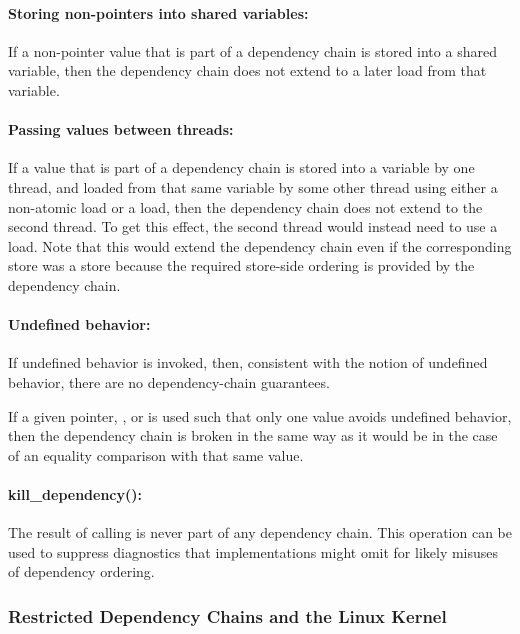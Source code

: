 \documentclass[letterpaper,twocolumn,10pt]{article}
\begin{document}
\paragraph{Storing non-pointers into shared variables:}
If a non-pointer value that is part of a dependency chain
is stored into a shared variable, then the dependency chain
does not extend to a later load from that variable.

\paragraph{Passing values between threads:}
If a value that is part of a dependency chain is stored into
a variable by one thread, and loaded from that same variable
by some other thread using either a non-atomic load or a
 load, then the dependency chain does
not extend to the second thread.
To get this effect, the second thread would instead need to use a
 load.
Note that this would extend the dependency chain even if the
corresponding store was a  store
because the required store-side ordering is provided by
the dependency chain.

\paragraph{Undefined behavior:}
If undefined behavior is invoked, then, consistent with the
notion of undefined behavior, there are no dependency-chain
guarantees.

If a given pointer, , or  is used
such that only one value avoids undefined behavior, then the
dependency chain is broken in the same way as it would be
in the case of an equality comparison with that same value.

\paragraph{kill\_dependency():}
The result of calling  is never part of
any dependency chain.
This operation can be used to suppress diagnostics that implementations
might omit for likely misuses of dependency ordering.

\subsubsection{Restricted Dependency Chains and the Linux Kernel}
\label{sec:Restricted Dependency Chains and the Linux Kernel}
\end{document}
